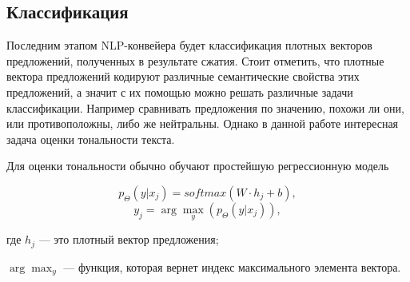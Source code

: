 
\subsection{Классификация}
Последним этапом NLP-конвейера будет классификация плотных векторов предложений, полученных в результате сжатия. Стоит отметить, что плотные вектора предложений кодируют различные семантические свойства этих предложений, а значит с их помощью можно решать различные задачи классификации. Например сравнивать предложения по значению, похожи ли они, или противоположны, либо же нейтральны. Однако в данной работе интересная задача оценки тональности текста\cite{Goodfellow-et-al-2016}.

Для оценки тональности обычно обучают простейшую регрессионную модель

\begin{equation}
  p_{\Theta}(y|x_j) = softmax(W\cdot{h_j} + b),
\end{equation}
\begin{equation}
  y_j = \arg \max_y(p_{\Theta}(y|x_j)),
\end{equation}
\begin{explanationx}
\item[где] $h_j$ --- это плотный вектор предложения;
\item$\arg \max_y$ --- функция, которая вернет индекс максимального элемента вектора.
\end{explanationx}